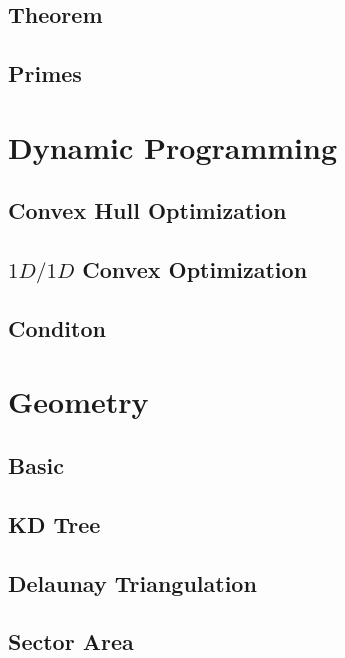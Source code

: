 \documentclass[a4paper,10pt,twocolumn,oneside]{article}
\begin{document}
\subsection{Theorem}

\subsection{Primes}

\section{Dynamic Programming}
% 
\subsection{Convex Hull Optimization}

\subsection{$1D/1D$ Convex Optimization}

\subsection{Conditon}

\section{Geometry}
\subsection{Basic}

\subsection{KD Tree}

\subsection{Delaunay Triangulation}

\subsection{Sector Area}

% 
\end{document}

